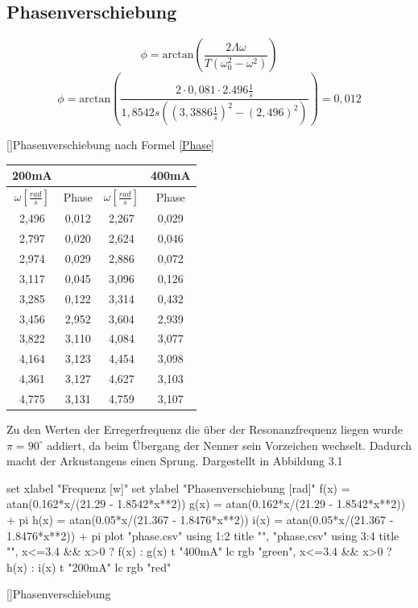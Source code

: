 \documentclass[12pt,a4paper,]{scrreprt}
\begin{document}
		\subsection{Phasenverschiebung}
        \begin{equation}
        	\phi = \text{arctan}(\frac{2\Lambda\omega}{T(\omega_0^2 - \omega^2)})
        \end{equation}
        \begin{equation}
        	\phi = \text{arctan}(\frac{2 \cdot 0,081 \cdot 2.496 \frac{1}{s}}{1,8542s((3,3886\frac{1}{s})^2 - (2,496)^2)}) = 0,012
        \end{equation}
        \begin{center}
        []{Phasenverschiebung nach Formel \ref{Phase}}
        \begin{tabular}{cc|cc}
         200mA& & &400mA  \\ \hline
$\omega [\frac{rad}{s}]$  & Phase & $\omega [\frac{rad}{s}]$  & Phase \\ \hline \hline
2,496 & 0,012 & 2,267 & 0,029 \\ \hline
2,797 & 0,020 & 2,624 & 0,046 \\ \hline
2,974 & 0,029 & 2,886 & 0,072 \\ \hline
3,117 & 0,045 & 3,096 & 0,126 \\ \hline
3,285 & 0,122 & 3,314 & 0,432 \\ \hline
3,456 & 2,952 & 3,604 & 2,939 \\ \hline
3,822 & 3,110 & 4,084 & 3,077 \\ \hline
4,164 & 3,123 & 4,454 & 3,098 \\ \hline
4,361 & 3,127 & 4,627 & 3,103 \\ \hline
4,775 & 3,131 & 4,759 & 3,107
\end{tabular}
\end{center}
        
Zu den Werten der Erregerfrequenz die über der Resonanzfrequenz liegen wurde $\pi = 90 ^\circ$ addiert, da beim Übergang der Nenner sein Vorzeichen wechselt. Dadurch macht der Arkustangens einen Sprung. Dargestellt in Abbildung 3.1\\
		
		\begin{gnuplot}[terminal=pdf,terminaloptions={font ",10" linewidth 3},scale=1.2]
			set xlabel "Frequenz [w]"
            set ylabel "Phasenverschiebung [rad]"
            f(x) = atan(0.162*x/(21.29 - 1.8542*x**2))
            g(x) = atan(0.162*x/(21.29 - 1.8542*x**2)) + pi
            h(x) = atan(0.05*x/(21.367 - 1.8476*x**2))
            i(x) = atan(0.05*x/(21.367 - 1.8476*x**2)) + pi
			plot "phase.csv" using 1:2 title "", "phase.csv" using 3:4 title "", x<=3.4 && x>0 ? f(x) : g(x) t "400mA" lc rgb "green", x<=3.4 && x>0 ? h(x) : i(x) t "200mA" lc rgb "red"
		\end{gnuplot}
        []{Phasenverschiebung}
\pagebreak
\end{document}
